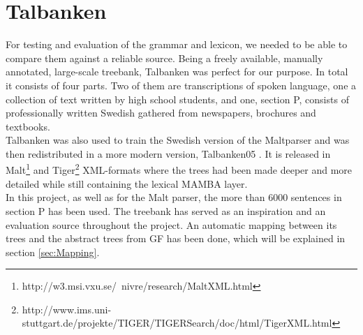 \documentclass{report}
\begin{document}
%
%


\section{Talbanken}
\label{sec:talbanken}
For testing and evaluation of the grammar and lexicon, we needed to be able to
compare them against a reliable source.
Being a freely available, manually annotated, large-scale treebank,
Talbanken \cite{talbanken} was perfect for our purpose.
In total it consists of four
parts. Two of them are transcriptions of spoken language, one a collection of
text written by high school students, and one, section P,
consists of professionally written Swedish gathered from newspapers, brochures and textbooks.\\
Talbanken was also used to train the Swedish version of the Maltparser \cite{malt}
and was then redistributed in a more modern version, Talbanken05 \cite{talbanken05}.
It is released in Malt\footnote{http://w3.msi.vxu.se/~nivre/research/MaltXML.html} 
and Tiger\footnote{http://www.ims.uni-stuttgart.de/projekte/TIGER/TIGERSearch/doc/html/TigerXML.html}
XML-formats
where the trees had been made deeper and more detailed while still containing
the lexical MAMBA layer. \\
In this project, as well as for the Malt parser, the more than 6000 sentences
in section P has been used.
The treebank has served as an inspiration and an evaluation source throughout the
project. An automatic mapping between its trees and the abstract trees from GF has been
done, which will be explained in section \ref{sec:Mapping}.
\end{document}
